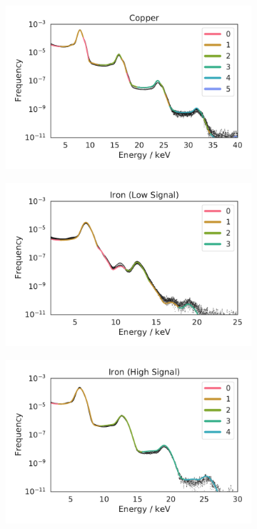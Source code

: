 \begin{figure}[h!]
	\centering
	\begin{subfigure}[b]{0.30\textwidth}
		\includegraphics[width=\linewidth]{images/thresholdsCopperHighNoBeta.pdf}
	\end{subfigure}
	\begin{subfigure}[b]{0.30\textwidth}
		\includegraphics[width=\linewidth]{images/thresholdsIronLow.pdf}
	\end{subfigure}
	\begin{subfigure}[b]{0.30\textwidth}
		\includegraphics[width=\linewidth]{images/thresholdsIronHigh.pdf}

\end{subfigure}
\end{figure}
